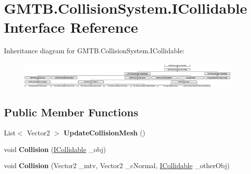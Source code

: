 \hypertarget{interface_g_m_t_b_1_1_collision_system_1_1_i_collidable}{}\section{G\+M\+T\+B.\+Collision\+System.\+I\+Collidable Interface Reference}
\label{interface_g_m_t_b_1_1_collision_system_1_1_i_collidable}
Inheritance diagram for G\+M\+T\+B.\+Collision\+System.\+I\+Collidable\+:\begin{figure}[H]
\begin{center}
\leavevmode
\includegraphics[height=1.414141cm]{interface_g_m_t_b_1_1_collision_system_1_1_i_collidable}
\end{center}
\end{figure}
\subsection*{Public Member Functions}
\begin{DoxyCompactItemize}
\item 
\mbox{\label{interface_g_m_t_b_1_1_collision_system_1_1_i_collidable_a027ed345850e7935671261a5d55d3e99}} 
List$<$ Vector2 $>$ {\bfseries Update\+Collision\+Mesh} ()
\item 
\mbox{\label{interface_g_m_t_b_1_1_collision_system_1_1_i_collidable_a11c4b7870582f119343dee785ef03d2b}} 
void {\bfseries Collision} (\mbox{\hyperlink{interface_g_m_t_b_1_1_collision_system_1_1_i_collidable}{I\+Collidable}} \+\_\+obj)
\item 
\mbox{\label{interface_g_m_t_b_1_1_collision_system_1_1_i_collidable_a519168861b9d1f8d521b41e4c7eab2ca}} 
void {\bfseries Collision} (Vector2 \+\_\+mtv, Vector2 \+\_\+c\+Normal, \mbox{\hyperlink{interface_g_m_t_b_1_1_collision_system_1_1_i_collidable}{I\+Collidable}} \+\_\+other\+Obj)
\end{DoxyCompactItemize}
